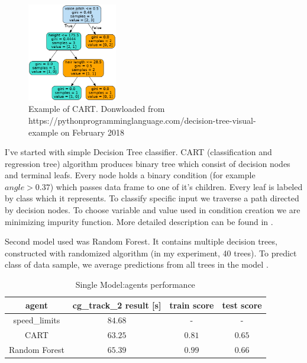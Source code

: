 \documentclass[declaration,shortabstract,english,inz]{iithesis}
\begin{document}
\begin{figure}
    \includegraphics[width=0.35\textwidth]{img/tree.png}
    \caption{Example of CART. Donwloaded from https://pythonprogramminglanguage.com/decision-tree-visual-example on February 2018 \cite{scrc_manual}}
    \label{fig:CART}
\end{figure}
I've started with simple Decision Tree classifier.
CART (classification and regression tree) algorithm produces binary tree which consist of decision nodes and terminal leafs.
Every node holds a binary condition (for example $\textit{angle} > 0.37$) which passes data frame to one of it's children.
Every leaf is labeled by class which it represents.
To classify specific input we traverse a path directed by decision nodes.
To choose variable and value used in condition creation we are minimizing impurity function.
More detailed description can be found in \cite{Introduction_ML}.



Second model used was Random Forest.
It contains multiple decision trees, constructed with randomized algorithm (in my experiment, 40 trees).
To predict class of data sample, we average predictions from all trees in the model \cite{Introduction_ML}.


\begin{table}[h]
    \centering
    \begin{tabular}{ |c|c|c|c|}
          \hline
          agent & cg\_track\_2 result [s] & train score & test score \\
          \hline
          speed\_limits & $84.68$ & - & -\\
          \hline
          CART &  $63.25$ & $0.81$ & $0.65$\\
          \hline
          Random Forest & $65.39$ & $0.99$ & $0.66$ \\
          \hline
          
        \end{tabular}
        \caption{Single Model:agents performance}
        \label{tab:single_clp_tree}

\end{table}
\end{document}
